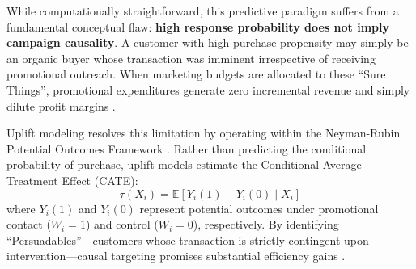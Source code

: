 \documentclass[11pt,a4paper]{article}
\begin{document}
While computationally straightforward, this predictive paradigm suffers from a fundamental conceptual flaw: \textbf{high response probability does not imply campaign causality}. A customer with high purchase propensity may simply be an organic buyer whose transaction was imminent irrespective of receiving promotional outreach. When marketing budgets are allocated to these ``Sure Things'', promotional expenditures generate zero incremental revenue and simply dilute profit margins \citep{radcliffe2011real, devriendt2018literature}.

Uplift modeling resolves this limitation by operating within the Neyman-Rubin Potential Outcomes Framework \citep{rubin1974estimating}. Rather than predicting the conditional probability of purchase, uplift models estimate the Conditional Average Treatment Effect (CATE):
\begin{equation}
\tau(X_i) = \mathbb{E}[Y_i(1) - Y_i(0) \mid X_i]
\end{equation}
where $Y_i(1)$ and $Y_i(0)$ represent potential outcomes under promotional contact ($W_i=1$) and control ($W_i=0$), respectively. By identifying ``Persuadables''---customers whose transaction is strictly contingent upon intervention---causal targeting promises substantial efficiency gains \citep{gutierrez2017causal, kunzel2019metalearners}.
\end{document}
